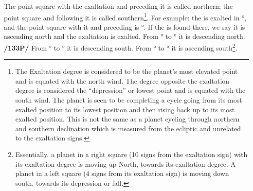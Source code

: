 The point square with the exaltation and preceding it is called northern; the point square and following it is called southern\footnote{The Exaltation degree  is considered to be the planet's most elevated point and is equated with the north wind. The degree opposite the exaltation degree is considered the ``depression'' or lowest point and is equated with the south wind. The planet is seen to be completing a cycle going from its most exalted position to its lowest position and then rising back up to its most exalted position. This is not the same as a planet cycling through northern and southern declination which is measured from the ecliptic and unrelated to the exaltation signs.}. For example: the \Sun\xspace is exalted in °, and the point square with it and preceding is °. If the \Sun\xspace is found there, we say it is ascending north and the exaltation is exalted. From \Aries\xspace 19° to \Cancer\xspace 19° it is descending north. \textbf{/133P/} From \Cancer\xspace 19° to \Libra\xspace 19° it is descending south. From \Libra\xspace 19° to \Capricorn\xspace 19° it is ascending south\footnote{Essentially, a planet in a right square (10 signs from the exaltation sign) with its exaltation degree is moving up North, towards its exaltation degree. A planet in a left square (4 signs from its exaltation sign) is moving down south, towards its depression or fall.}.

